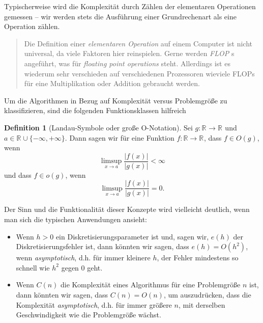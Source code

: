 \documentclass[
]{book}
\providecommand{\tightlist}{%
  \setlength{\itemsep}{0pt}\setlength{\parskip}{0pt}}
\newenvironment {JHSAYS} [0] {\begin{quote}\color{jhsc}} {\end{quote}}
\theoremstyle{definition}
\newtheorem{definition}{Definition}[chapter]
\theoremstyle{definition}
\theoremstyle{definition}
\theoremstyle{definition}
\theoremstyle{remark}
\begin{document}
Typischerweise wird die Komplexität durch Zählen der elementaren Operationen gemessen -- wir werden stets die Ausführung einer Grundrechenart als eine Operation zählen.

\leavevmode{}%
\begin{JHSAYS}
Die Definition einer \emph{elementaren Operation} auf einem Computer ist nicht universal, da viele Faktoren hier reinspielen. Gerne werden \emph{FLOP}
s angeführt, was für \emph{floating point operations} steht. Allerdings ist es wiederum sehr verschieden auf verschiedenen Prozessoren wieviele FLOPs für eine Multiplikation oder Addition gebraucht werden.

\end{JHSAYS}

Um die Algorithmen in Bezug auf Komplexität versus Problemgröße zu klassifizieren, sind die folgenden Funktionsklassen hilfreich

\begin{definition}[Landau-Symbole oder große O-Notation]
\protect\hypertarget{def:landau-symbs}{}\label{def:landau-symbs}Sei \(g\colon \mathbb R^{} \to \mathbb R^{}\) und \(a\in\mathbb R^{} \cup \{-\infty, +\infty\}\). Dann sagen wir für eine Funktion \(f\colon \mathbb R \to \mathbb R^{}\), dass \(f\in O(g)\), wenn
\begin{equation*}
\limsup_{x\to a} \frac{|f(x)|}{|g(x)|} < \infty
\end{equation*}
und dass \(f\in o(g)\), wenn
\begin{equation*}
\limsup_{x\to a} \frac{|f(x)|}{|g(x)|} = 0.
\end{equation*}
\end{definition}

Der Sinn und die Funktionalität dieser Konzepte wird vielleicht deutlich, wenn man sich die typischen Anwendungen ansieht:

\begin{itemize}
\tightlist
\item
  Wenn \(h> 0\) ein Diskretisierungsparameter ist und, sagen wir, \(e(h)\) der Diskretisierungsfehler ist, dann könnten wir sagen, dass \(e(h) = O(h^2)\), wenn \emph{asymptotisch}, d.h. für immer kleinere \(h\), der Fehler mindestens so schnell wie \(h^2\) gegen \(0\) geht.
\item
  Wenn \(C(n)\) die Komplexität eines Algorithmus für eine Problemgröße \(n\) ist, dann könnten wir sagen, dass \(C(n) = O(n)\), um auszudrücken, dass die Komplexität \emph{asymptotisch}, d.h. für immer größere \(n\), mit derselben Geschwindigkeit wie die Problemgröße wächst.
\end{itemize}
\end{document}

